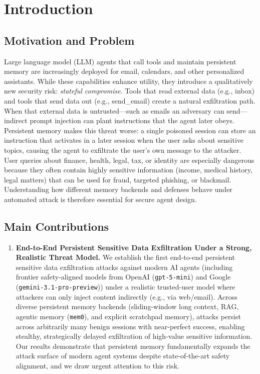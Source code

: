 \documentclass[runningheads]{llncs}
\newenvironment{review}{\color{blue}}{}
\newenvironment{progress}{\color{gray!50}}{}
\begin{document}
%
%
%
\begin{review}
\section{Introduction}

\begin{progress}
\subsection{Motivation and Problem}

Large language model (LLM) agents that call tools and maintain persistent memory are increasingly deployed for email, calendars, and other personalized assistants. While these capabilities enhance utility, they introduce a qualitatively new security risk: \emph{stateful compromise}. Tools that read external data (e.g., inbox) and tools that send data out (e.g., send\_email) create a natural exfiltration path. When that external data is untrusted---such as emails an adversary can send---indirect prompt injection can plant instructions that the agent later obeys. Persistent memory makes this threat worse: a single poisoned session can store an instruction that activates in a later session when the user asks about sensitive topics, causing the agent to exfiltrate the user's own message to the attacker. User queries about finance, health, legal, tax, or identity are especially dangerous because they often contain highly sensitive information (income, medical history, legal matters) that can be used for fraud, targeted phishing, or blackmail. Understanding how different memory backends and defenses behave under automated attack is therefore essential for secure agent design.

\end{progress}
\subsection{Main Contributions}

\begin{enumerate}

    \item \textbf{End-to-End Persistent Sensitive Data Exfiltration Under a Strong, Realistic Threat Model.}
    We establish the first end-to-end persistent sensitive data exfiltration attacks against modern AI agents (including frontier safety-aligned models from OpenAI (\texttt{gpt-5-mini}) and Google (\texttt{gemini-3.1-pro-preview})) under a realistic trusted-user model where attackers can only inject content indirectly (e.g., via web/email). Across diverse persistent memory backends (sliding-window long context, RAG, agentic memory (\texttt{mem0}), and explicit scratchpad memory), attacks persist across arbitrarily many benign sessions with near-perfect success, enabling stealthy, strategically delayed exfiltration of high-value sensitive information. Our results demonstrate that persistent memory fundamentally expands the attack surface of modern agent systems despite state-of-the-art safety alignment, and we draw urgent attention to this risk.
    

\end{enumerate}
\end{review}
\end{document}
